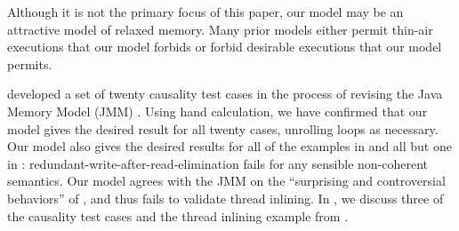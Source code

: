 \documentclass[conference]{IEEEtran}
\theoremstyle{plain}
\theoremstyle{definition}
\begin{document}
Although it is not the primary focus of this paper, our model may be an
attractive model of relaxed memory.  Many prior models either permit
thin-air executions that our model forbids or forbid desirable executions
that our model permits.



\citet{PughWebsite} developed a set of twenty {causality test cases} in the
process of revising the Java Memory Model (JMM)
\cite{Manson:2005:JMM:1047659.1040336}.  Using hand calculation, we have
confirmed that our model gives the desired result for all twenty cases,
unrolling loops as necessary.  Our model also gives the desired results for
all of the examples in \citet[]{DBLP:conf/esop/BattyMNPS15} and
all but one in \citet[]{SevcikThesis}:
redundant-write-after-read-elimination fails for any
sensible non-coherent semantics.  Our model agrees with the JMM on the
``surprising and controversial behaviors'' of \citet[]{Manson:2005:JMM:1047659.1040336}, and thus fails to validate thread
inlining.
In , we discuss three of the causality test cases and the thread
inlining example from \cite{Manson:2005:JMM:1047659.1040336}.%
\end{document}
